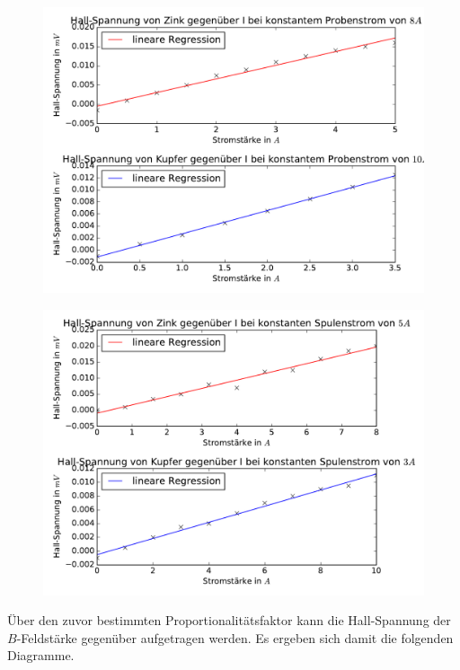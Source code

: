 \begin{figure}
  \includegraphics[width=\textwidth]{Hall_Spannung_gegenueber_I_s.pdf}
  \label{fig:U_H_const_Ip}
\end{figure}

\begin{figure}
  \includegraphics[width=\textwidth]{Hall_Spannung_gegenueber_I_p.pdf}
  \label{fig:U_H_const_Is}
\end{figure}
\FloatBarrier

Über den zuvor bestimmten Proportionalitätsfaktor kann die Hall-Spannung
der $B$-Feldstärke gegenüber aufgetragen werden. Es ergeben sich damit die
folgenden Diagramme.

